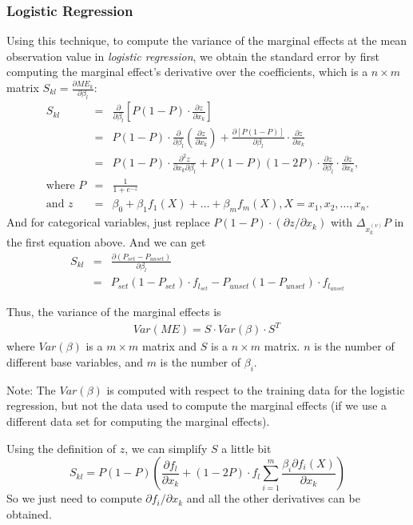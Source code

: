 \subsubsection*{Logistic Regression}
Using this technique, to compute the variance of the marginal effects
at the mean observation value in \emph{logistic regression}, we obtain
the standard error by first computing the marginal effect's derivative
over the coefficients, which is a $n\times m$ matrix $S_{kl}
= \frac{\partial \mathit{ME}_k}{\partial \beta_l}$:
\begin{eqnarray*}
  S_{kl} &=& \frac{\partial}{\partial\beta_l} \left[P (1- P)
    \cdot \frac{\partial z}{\partial x_k}\right]\\
  &=& P (1- P) \cdot \frac{\partial}{\partial\beta_l}\left(\frac{\partial z}{\partial x_k}\right)
    + \frac{\partial \left[P (1- P)\right]}{\partial\beta_l} \cdot \frac{\partial z}{\partial x_k}\\
  &=& P(1-P)\cdot\frac{\partial^2 z}{\partial x_k\partial\beta_l}
    + P(1-P)(1-2P) \cdot \frac{\partial z}{\partial \beta_l} \cdot \frac{\partial z}{\partial x_k},\\
  \text{where } P &=& \frac{1}{1 + e^{-z}} \\
  \text{and } z &=& \beta_0 + \beta_1 f_1(X)+ \dots + \beta_m f_m(X),
  X = x_1, x_2, \dots, x_n.
\end{eqnarray*}
And for categorical variables, just replace $P(1-P)\cdot(\partial z/\partial x_k)$
with $\Delta_{x_k^{(v)}}P$ in the first equation above. And we can get
\begin{eqnarray*}
  S_{kl} &=& \frac{\partial(P_{set}-P_{unset})}{\partial\beta_l}  \\
  &=& P_{set} (1 - P_{set}) \cdot f_{l_{set}} - P_{unset} (1 - P_{unset}) \cdot f_{l_{unset}}
\end{eqnarray*}

Thus, the variance of the marginal effects is
\begin{align*}
  Var(\mathit{ME}) = S \cdot Var(\beta)\cdot S^T\,
\end{align*}
where $Var(\beta)$ is a $m\times m$ matrix and $S$ is a $n\times m$
matrix. $n$ is the number of different base variables, and $m$ is the
number of $\beta_i$.

Note: The $Var(\beta)$ is computed with respect to the training data
for the logistic regression, but not the data used to compute the
marginal effects (if we use a different data set for computing the
marginal effects).

Using the definition of $z$, we can simplify $S$ a little bit
\begin{equation}
  S_{kl} = P(1-P)\left(\frac{\partial f_l}{\partial x_k} + (1-2P)\cdot f_l\sum_{i=1}^{m}\frac{\beta_i\partial f_i(X)}{\partial x_k}\right)
\end{equation}
So we just need to compute $\partial f_i/\partial x_k$ and all the
other derivatives can be obtained.


